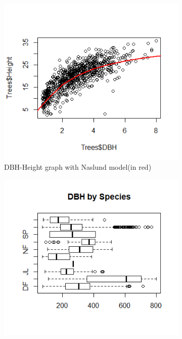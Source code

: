 \documentclass[a4paper,11pt,twoside]{report}
\begin{document}
\begin{figure}[h]
\centering
\caption[relationship]{DBH - Height plot with boxplots showing species effect on DBH and height}
\begin{subfigure}{.5\linewidth}
\centering
\caption{DBH-Height graph with Naslund model(in red)}
      \includegraphics[width=1\linewidth]{Images/Naslund_Fun.png}
\end{subfigure}
\begin{subfigure}{.5\textwidth}
  \centering
  \includegraphics[width=1\linewidth]{Images/DBH_SPECIES.png}

\end{subfigure}
\end{figure}
\end{document}
